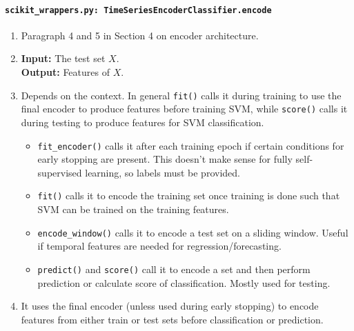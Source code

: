 \documentclass[a4paper,11pt]{article}
\newcommand{\code}[1]{\texttt{#1}}
\begin{document}
\paragraph{\code{scikit\_wrappers.py: TimeSeriesEncoderClassifier.encode}}
\begin{enumerate}[label=(\roman*)]
\item Paragraph 4 and 5 in Section 4 on encoder architecture.
\item 
    \textbf{Input:} The test set $X$. \\
    \textbf{Output:} Features of $X$.
\item Depends on the context. In general \texttt{fit()} calls it during training to use the final encoder to produce features before training SVM, while \texttt{score()} calls it during testing to produce features for SVM classification.
\begin{itemize}
\item \texttt{fit\_encoder()} calls it after each training epoch if certain conditions for early stopping are present. This doesn't make sense for fully self-supervised learning, so labels must be 
provided.
\item \texttt{fit()} calls it to encode the training set once training is done such that SVM can be trained on the training features.
\item \texttt{encode\_window()} calls it to encode a test set on a sliding window. Useful if temporal features are needed for regression/forecasting.
\item \texttt{predict()} and \texttt{score()} call it to encode a set and then perform prediction or calculate score of classification. Mostly used for testing.
\end{itemize}
\item It uses the final encoder (unless used during early stopping) to encode features from either train or test sets before classification or prediction.
\end{enumerate}
\end{document}
